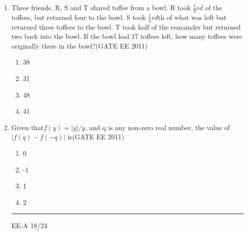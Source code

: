 \documentclass[a4paper,10pt]{exam}
\theoremstyle{remark}
\begin{document}
\begin{enumerate}
\\
From the given data, we can conclude that the fuel consumed per kilometre was least during the lap
\begin{multicols}{4}
\begin{enumerate}
\item P
\item Q
\item R
\item S
\end{enumerate}
\end{multicols}
\item Three friends, R, S and T shared toffee from a bowl. R took $\frac{1}{3}rd$ of the toffees, but returned four to the bowl. S took $\frac{1}{4}rd$th of what was left but returned three toffees to the bowl. T took half of the remainder but returned two back into the bowl. If the bowl had 17 toffees left, how many toffees were originally there in the bowl?\hfill{(GATE EE 2011)}
\begin{multicols}{4}
\begin{enumerate}
\item 38
\item 31
\item 48
\item 41
\end{enumerate}
\end{multicols}
\item Given that$ f(y)=|y|/ y$, and q is any non-zero real number, the value of $ |f(q) - f(-q) |$
 is\hfill{(GATE EE 2011)}
\begin{multicols}{4}
\begin{enumerate}
\item 0
\item -1
\item 1
\item 2
\end{enumerate}
\end{multicols}

\vfill
\noindent\rule{\textwidth}{0.4pt}
\raggedright{EE-A}
\hfill
18/24



\end{enumerate}
\end{document}
